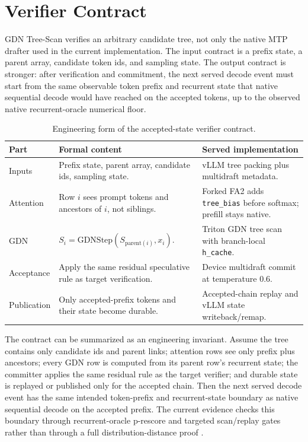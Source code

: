 \documentclass[conference]{IEEEtran}
\newcommand{\sys}{GDN Tree-Scan}
\newcommand{\code}[1]{\texttt{#1}}
\newcommand{\rowsep}{\specialrule{0.15pt}{1.2pt}{1.2pt}}
\begin{document}
\section{Verifier Contract}

\sys{} verifies an arbitrary candidate tree, not only the native MTP drafter used in the current implementation. The input contract is a prefix state, a parent array, candidate token ids, and sampling state. The output contract is stronger: after verification and commitment, the next served decode event must start from the same observable token prefix and recurrent state that native sequential decode would have reached on the accepted tokens, up to the observed native recurrent-oracle numerical floor.

\begin{table}[t]
\caption{Engineering form of the accepted-state verifier contract.}
\label{tab:contract}
\centering
\scriptsize
\begin{adjustbox}{width=\columnwidth}
\begin{tabular}{L{0.21\columnwidth} L{0.37\columnwidth} L{0.32\columnwidth}}
\toprule
Part & Formal content & Served implementation \\
\midrule
Inputs & Prefix state, parent array, candidate ids, sampling state. & vLLM tree packing plus multidraft metadata. \\
\rowsep
Attention & Row \(i\) sees prompt tokens and ancestors of \(i\), not siblings. & Forked FA2 adds \code{tree\_bias} before softmax; prefill stays native. \\
\rowsep
GDN & \(S_i=\mathrm{GDNStep}(S_{\mathrm{parent}(i)},x_i)\). & Triton GDN tree scan with branch-local \code{h\_cache}. \\
\rowsep
Acceptance & Apply the same residual speculative rule as target verification. & Device multidraft commit at temperature 0.6. \\
\rowsep
Publication & Only accepted-prefix tokens and their state become durable. & Accepted-chain replay and vLLM state writeback/remap. \\
\bottomrule
\end{tabular}
\end{adjustbox}
\end{table}

The contract can be summarized as an engineering invariant. Assume the tree contains only candidate ids and parent links; attention rows see only prefix plus ancestors; every GDN row is computed from its parent row's recurrent state; the committer applies the same residual rule as the target verifier; and durable state is replayed or published only for the accepted chain. Then the next served decode event has the same intended token-prefix and recurrent-state boundary as native sequential decode on the accepted prefix. The current evidence checks this boundary through recurrent-oracle p-rescore and targeted scan/replay gates rather than through a full distribution-distance proof \cite{miao2023specinfer}.
\end{document}
